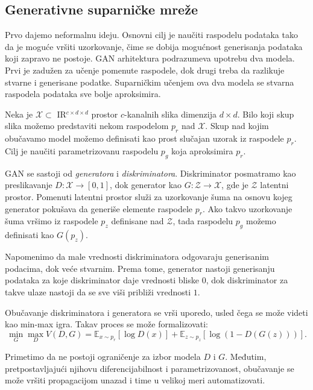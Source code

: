 \documentclass[12pt, a4paper]{article}
\newcommand{\R}{$ {\rm I\!R}$}
\begin{document}
\subsection{Generativne suparničke mreže}
	Prvo dajemo neformalnu ideju. Osnovni cilj je naučiti raspodelu podataka tako da je moguće vršiti uzorkovanje, čime se dobija mogućnost generisanja podataka koji zapravo ne postoje. GAN arhitektura podrazumeva upotrebu dva modela. Prvi je zadužen za učenje pomenute raspodele, dok drugi treba da razlikuje stvarne i generisane podatke. Suparničkim učenjem ova dva modela se stvarna raspodela podataka sve bolje aproksimira.
	
	Neka je $\mathcal{X}\subset \R^{c \times d \times d}$ prostor $c$-kanalnih slika dimenzija $d\times d$. Bilo koji skup slika možemo predstaviti nekom raspodelom $p_r$ nad $\mathcal{X}$. Skup nad kojim obučavamo model možemo definisati kao prost slučajan uzorak iz raspodele $p_r$. Cilj je naučiti parametrizovanu raspodelu $p_g$ koja aproksimira $p_r$.
	
	GAN se sastoji od \textit{generatora} i \textit{diskriminatora}. Diskriminator posmatramo kao preslikavanje $D: \mathcal{X} \rightarrow [0, 1]$, dok generator kao $G:\mathcal{Z} \rightarrow \mathcal{X}$, gde je $\mathcal{Z}$ latentni prostor. Pomenuti latentni prostor služi za uzorkovanje šuma na osnovu kojeg generator pokušava da generiše elemente raspodele $p_r$. Ako takvo uzorkovanje šuma vršimo iz raspodele $p_z$ definisane nad $\mathcal{Z}$, tada raspodelu $p_g$ možemo definisati kao $G(p_z)$.
	
	Napomenimo da male vrednosti diskriminatora odgovaraju generisanim podacima, dok veće stvarnim. Prema tome, generator nastoji generisanju podataka za koje diskriminator daje vrednosti bliske $0$, dok diskriminator za takve ulaze nastoji da se sve viši približi vrednosti $1$.
	
	Obučavanje diskriminatora i generatora se vrši uporedo, usled čega se može videti kao min-max igra. Takav proces se može formalizovati:
	\begin{equation}
	\min_{G}\max_{D}V(D, G) = \mathbb{E}_{x \sim p_r}[\log D(x)] + \mathbb{E}_{z \sim p_z}[\log(1 - D(G(z)))].
	\label{eq:GANClassic}
	\end{equation}
	
	Primetimo da ne postoji ograničenje za izbor modela $D$ i $G$. Međutim, pretpostavljajući njihovu diferencijabilnost i parametrizovanost, obučavanje se može vršiti propagacijom unazad i time u velikoj meri automatizovati.
	
\end{document}

